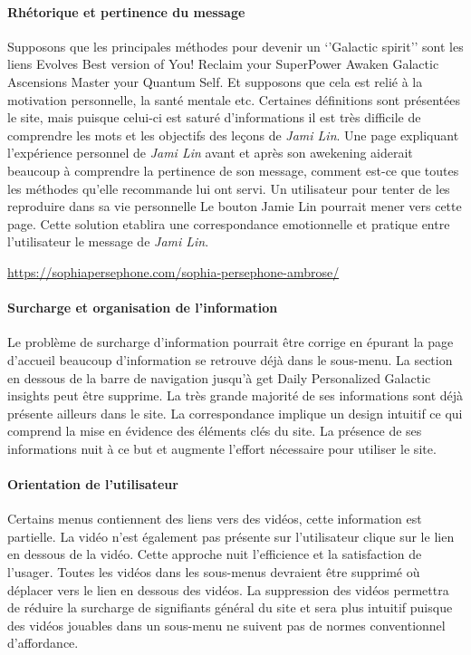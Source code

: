 \documentclass[9pt]{report}
\begin{document}
\begin{multicols*}{2}
\paragraph{Rhétorique et pertinence du message}
Supposons que les principales méthodes pour devenir un ‘’Galactic spirit’’ sont les liens Evolves Best version of You! Reclaim your SuperPower Awaken Galactic Ascensions Master your Quantum Self. Et supposons que cela est relié 
à la motivation personnelle, la santé mentale etc. Certaines définitions sont présentées le site, mais puisque celui-ci est saturé d’informations il est très difficile de comprendre les mots et les objectifs des leçons de \textit{Jami Lin}. Une page expliquant l’expérience personnel de \textit{Jami Lin} avant et après son awekening aiderait beaucoup à comprendre la pertinence de son message, comment est-ce que toutes les méthodes qu’elle recommande lui ont servi. Un utilisateur pour tenter de les reproduire dans sa vie personnelle Le bouton Jamie Lin pourrait mener vers cette page. Cette solution etablira une correspondance  emotionnelle et pratique entre l’utilisateur le message de \textit{Jami Lin}.

\begin{EExample}{}{}
  \href{ https://sophiapersephone.com/sophia-persephone-ambrose/}{ https://sophiapersephone.com/sophia-persephone-ambrose/}
\end{EExample}


\paragraph{Surcharge et organisation de l’information}
Le problème de surcharge d’information pourrait être corrige en épurant la page d’accueil beaucoup d’information se retrouve déjà dans le sous-menu. La section en dessous de la barre de navigation jusqu’à get Daily Personalized Galactic insights peut être supprime. La très grande majorité de ses informations sont déjà présente ailleurs dans le site. La correspondance implique un design intuitif ce qui comprend la mise en évidence des éléments clés du site. La présence de ses informations nuit à ce but et augmente l’effort nécessaire pour utiliser le site.



\paragraph{Orientation de l’utilisateur}
Certains menus contiennent des liens vers des vidéos, cette information est partielle. La vidéo n’est également pas présente sur l’utilisateur clique sur le lien en dessous de la vidéo. Cette approche nuit l’efficience et la satisfaction de l’usager. Toutes les vidéos dans les sous-menus devraient être supprimé où déplacer vers le lien en dessous des vidéos. La suppression des vidéos permettra de réduire la surcharge de signifiants général du site et sera plus intuitif puisque des vidéos jouables dans un sous-menu ne suivent pas de normes conventionnel d’affordance. 


\end{multicols*}
\end{document}
